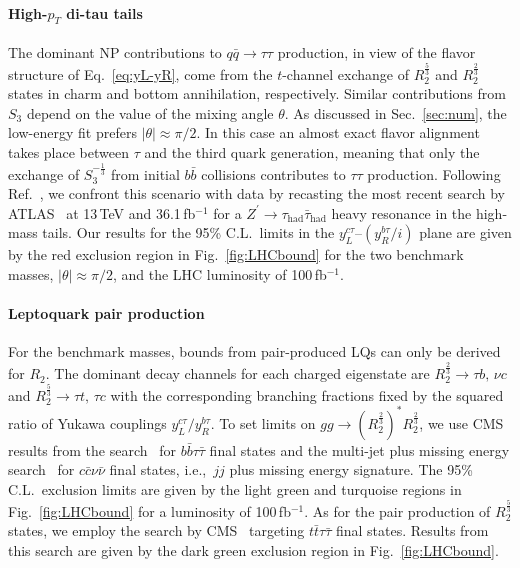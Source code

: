 \documentclass[aps,prd,superscriptaddress,twocolumn,secnumarabic]{revtex4-1}
\begin{document}
\paragraph*{High-$p_T$ di-tau tails} The dominant NP contributions to $q\bar q\!\to\!\tau\tau$ production, in view of the flavor structure of Eq.~\eqref{eq:yL-yR}, come from the $t$-channel exchange of $R_2^{\frac{5}{3}}$ and $R_2^{\frac{2}{3}}$ states in charm and bottom annihilation, respectively. Similar contributions from $S_3$ depend on the value of the mixing angle $\theta$. As discussed in Sec.~\ref{sec:num}, the low-energy fit prefers $|\theta| \approx \pi/2$. In this case an almost exact flavor alignment takes place between $\tau$ and the third quark generation, meaning that only the exchange of $S_3^{-\frac{1}{3}}$ from initial $b\bar b$ collisions contributes to $\tau\tau$ production. Following Ref.~\cite{Faroughy:2016osc}, we confront this scenario with data by recasting the most recent search by ATLAS~\cite{Aaboud:2017sjh} at 13\,TeV and 36.1\,fb$^{-1}$ for a $Z^\prime\!\to\!\tau_{\text{had}}\bar\tau_{\text{had}}$ heavy resonance in the high-mass tails. Our results for the 95\% C.L.\ limits in the $y_L^{c\tau}$--$(y_R^{b\tau}/i)$ plane are given by the red exclusion region in Fig.~\ref{fig:LHCbound} for the two benchmark masses, $|\theta| \approx\pi/2$, and the LHC luminosity of 100\,fb$^{-1}$. 

\paragraph*{Leptoquark pair production} For the benchmark masses, bounds from pair-produced LQs can only be derived for $R_2$. The dominant decay channels for each charged eigenstate are $R_2^{\frac{2}{3}} \to \tau b,\,\nu c$ and $R_2^{\frac{5}{3}} \to \tau t,\, \tau c$ with the corresponding branching fractions fixed by the squared ratio of Yukawa couplings $y_L^{c\tau}/y_R^{b\tau}$. To set limits on $gg \to (R_2^{\frac{2}{3}})^* R_2^{\frac{2}{3}}$, we use CMS results from the search~\cite{Sirunyan:2017yrk} for $b\bar b \tau\bar\tau$ final states and the multi-jet plus missing energy search~\cite{CMS:2017kmd} for $c\bar c \nu\bar\nu$ final states, i.e.,~$jj$ plus missing energy signature. The 95\% C.L.\ exclusion limits are given by the light green and turquoise regions in Fig.~\ref{fig:LHCbound} for a luminosity of 100\,fb$^{-1}$. As for the pair production of $R_2^{\frac{5}{3}}$ states, we employ the search by CMS~\cite{Sirunyan:2018nkj} targeting $t\bar t \tau\bar\tau$ final states. Results from this search are given by the dark green exclusion region in Fig.~\ref{fig:LHCbound}.
\end{document}
